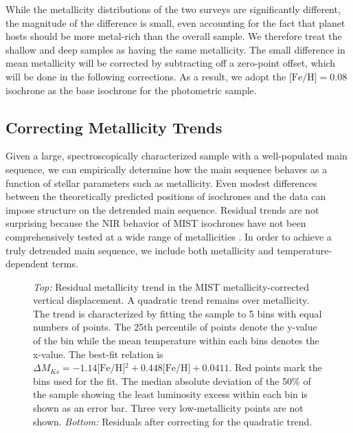 \documentclass[twocolumn]{aastex6}
\newcommand{\MK}{\ensuremath{M_{Ks}}}
\newcommand{\feh}{\textrm{[Fe/H]}}
\begin{document}
While the metallicity distributions of the two surveys are significantly 
different, the magnitude of the difference is small, even accounting for the 
fact that planet hosts should be more metal-rich than the overall sample. We 
therefore treat the shallow and deep samples as having the same metallicity.
The small difference in mean metallicity will be corrected by subtracting off a 
zero-point offset, which will be done in the following corrections. As a result, 
we adopt the \(\feh{} = 0.08\) isochrone as the base isochrone for the 
photometric sample. 

\subsection{Correcting Metallicity Trends}
\label{sec:speccor}

Given a large, spectroscopically characterized sample with a well-populated 
main sequence, we can empirically determine how the main sequence behaves as a
function of stellar parameters such as metallicity.  Even modest differences 
between the theoretically predicted positions of isochrones and the data can 
impose structure on the detrended main sequence. Residual trends are not 
surprising because the NIR behavior of MIST isochrones have not been 
comprehensively tested at a wide range of metallicities \citep{Choi16}.  In 
order to achieve a truly detrended main sequence, we include both metallicity 
and temperature-dependent terms.

\begin{figure}[htb]
    \centering
    \caption{\emph{Top:} Residual metallicity trend in the MIST 
        metallicity-corrected vertical displacement. A quadratic trend remains over 
        metallicity. The trend is characterized by fitting the sample to 
        5 bins with equal numbers of points.  The 25th percentile of points 
        denote the y-value of the bin while the mean temperature within each
        bins denotes the x-value. The best-fit relation is \(\Delta
            \MK{} = -1.14\feh{}^2 + 0.448 \feh{} + 0.0411\). Red points mark 
            the bins used for the fit.  The median absolute deviation of the 
            50\% of the sample showing the
        least luminosity excess within each bin is shown as an error bar. Three 
        very low-metallicity points are not shown.  \emph{Bottom:} Residuals 
        after correcting for the quadratic trend.}\label{fig:met_trend}
\end{figure}
\end{document}

